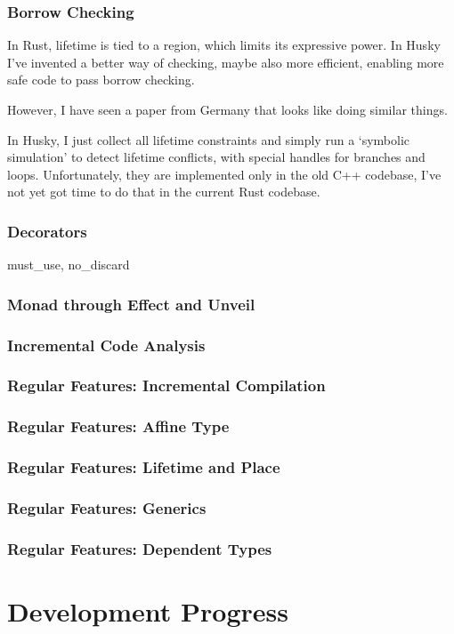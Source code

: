 \documentclass{beamer}   	%
\theoremstyle{definition}
\begin{document}
\begin{frame}
\frametitle{Borrow Checking}
In Rust, lifetime is tied to a region, which limits its expressive power. In Husky I've invented a better way of checking, maybe also more efficient, enabling more safe code to pass borrow checking.

{\color{gray}However, I have seen a paper from Germany that looks like doing similar things.}

In Husky, I just collect all lifetime constraints and simply run a `symbolic simulation' to detect lifetime conflicts, with special handles for branches and loops. Unfortunately, they are implemented only in the old C++ codebase, I've not yet got time to do that in the current Rust codebase.
\end{frame}

\begin{frame}
\frametitle{Decorators}
must\_use, no\_discard

\end{frame}

\begin{frame}
\frametitle{Monad through Effect and Unveil}
\end{frame}

\begin{frame}
\frametitle{Incremental Code Analysis}
\end{frame}

\begin{frame}
\frametitle{Regular Features: Incremental Compilation}
\end{frame}

\begin{frame}
\frametitle{Regular Features: Affine Type}
\end{frame}

\begin{frame}
\frametitle{Regular Features: Lifetime and Place}
\end{frame}

\begin{frame}
\frametitle{Regular Features: Generics}
\end{frame}

\begin{frame}
\frametitle{Regular Features: Dependent Types}
\end{frame}

\section{Development Progress}
\end{document}
